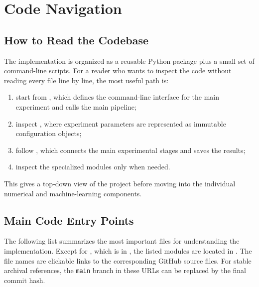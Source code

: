 \chapter{Code Navigation}

\section{How to Read the Codebase}

The implementation is organized as a reusable Python package plus a small set of command-line scripts.
For a reader who wants to inspect the code without reading every file line by line, the most useful path is:

\begin{enumerate}
    \item start from \href{https://github.com/matteogiorgi/nn-option-pricing/blob/main/scripts/run_experiment.py}{}, which defines the command-line interface for the main experiment and calls the main pipeline;
    \item inspect \href{https://github.com/matteogiorgi/nn-option-pricing/blob/main/src/nn_option_pricing/config.py}{}, where experiment parameters are represented as immutable configuration objects;
    \item follow \href{https://github.com/matteogiorgi/nn-option-pricing/blob/main/src/nn_option_pricing/pipeline.py}{}, which connects the main experimental stages and saves the results;
    \item inspect the specialized modules only when needed.
\end{enumerate}
This gives a top-down view of the project before moving into the individual numerical and machine-learning components.

\section{Main Code Entry Points}

The following list summarizes the most important files for understanding the implementation.
Except for , which is in , the listed modules are located in .
The file names are clickable links to the corresponding GitHub source files.
For stable archival references, the \texttt{main} branch in these URLs can be replaced by the final commit hash.

